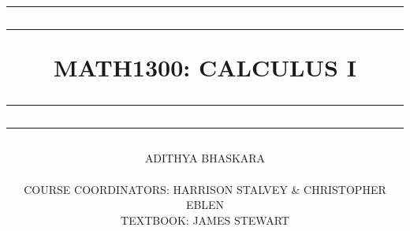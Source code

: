 \title{

    \rule{15cm}{1.6pt}\vspace*{-\baselineskip}\vspace*{2pt}
    \rule{15cm}{0.4pt}
	
	\vspace{0.75\baselineskip}
		
	\Huge{MATH1300: CALCULUS I\\\vspace{3mm}}

	\rule{15cm}{0.4pt}\vspace*{-\baselineskip}\vspace{3.2pt}
	\rule{15cm}{1.6pt}

}

\author{ADITHYA BHASKARA\\\\\vspace{1em}\small{COURSE COORDINATORS: HARRISON STALVEY \& CHRISTOPHER EBLEN}\\\vspace{1em}\small{TEXTBOOK: JAMES STEWART}}

\date{}